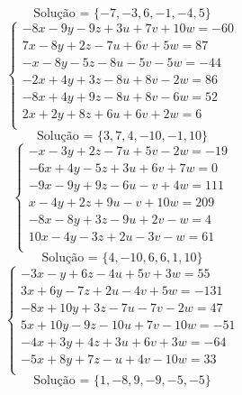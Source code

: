 \documentclass[12pt,oneside,a4paper]{article}
\begin{document}
\begin{equation*}
\text{Solução = }\{-7,-3,6,-1,-4,5\}
\end{equation*}
\vspace{\baselineskip}
\begin{equation*}
\begin{cases}
-8x-9y-9z+3u+7v+10w=-60 \\
7x-8y+2z-7u+6v+5w=87 \\
-x-8y-5z-8u-5v-5w=-44 \\
-2x+4y+3z-8u+8v-2w=86 \\
-8x+4y+9z-8u+8v-6w=52 \\
2x+2y+8z+6u+6v+2w=6 \\
\end{cases}
\end{equation*}
\begin{equation*}
\text{Solução = }\{3,7,4,-10,-1,10\}
\end{equation*}
\vspace{\baselineskip}
\begin{equation*}
\begin{cases}
-x-3y+2z-7u+5v-2w=-19 \\
-6x+4y-5z+3u+6v+7w=0 \\
-9x-9y+9z-6u-v+4w=111 \\
x-4y+2z+9u-v+10w=209 \\
-8x-8y+3z-9u+2v-w=4 \\
10x-4y-3z+2u-3v-w=61 \\
\end{cases}
\end{equation*}
\begin{equation*}
\text{Solução = }\{4,-10,6,6,1,10\}
\end{equation*}
\vspace{\baselineskip}
\begin{equation*}
\begin{cases}
-3x-y+6z-4u+5v+3w=55 \\
3x+6y-7z+2u-4v+5w=-131 \\
-8x+10y+3z-7u-7v-2w=47 \\
5x+10y-9z-10u+7v-10w=-51 \\
-4x+3y+4z+3u+6v+3w=-64 \\
-5x+8y+7z-u+4v-10w=33 \\
\end{cases}
\end{equation*}
\begin{equation*}
\text{Solução = }\{1,-8,9,-9,-5,-5\}
\end{equation*}
\end{document}
